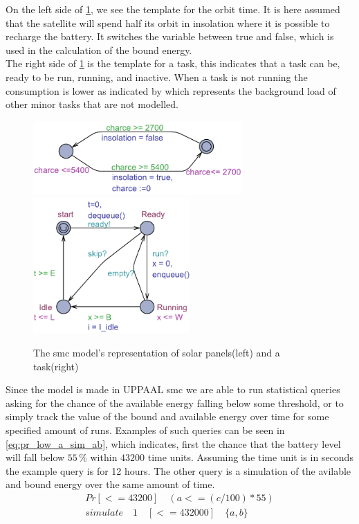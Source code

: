 On the left side of \cref{fig:solar_task}, we see the template for the orbit time. It is here assumed that the satellite will spend half its orbit in insolation where it is possible to recharge the battery. It switches the variable  between true and false, which is used in the calculation of the bound energy.\\
The right side of \cref{fig:solar_task} is the template for a task, this indicates that a task can be, ready to be run, running, and inactive. When a task is not running the consumption is lower as indicated by  which represents the background load of other minor tasks that are not modelled.

\begin{figure}[H]%
	\centering
	\subfloat
	{{\includegraphics[width=8cm]{graphics/smc_solar.pdf} }}%
	\qquad
	\subfloat
	{{\includegraphics[width=6cm]{graphics/smc_task.pdf} }}%
	\caption{The \gls{smc} model's representation of solar panels(left) and a task(right)}%
	\label{fig:solar_task}%
\end{figure}
Since the model is made in UPPAAL \gls{smc} we are able to run statistical queries asking for the chance of the available energy falling below some threshold, or to simply track the value of the bound and available energy over time for some specified amount of runs. Examples of such queries can be seen in \cref{eq:pr_low_a_sim_ab}, which indicates, first the chance that the battery level will fall below $55\, \%$ within $43200$ time units. Assuming the time unit is in seconds the example query is for 12 hours. The other query is a simulation of the avilable and bound energy over the same amount of time.\\
\begin{align}
Pr[<= 43200] \quad(a <= (c/100)*55)		\nonumber \\
simulate \quad 1 \quad [<=432000] \quad \{a,b\} 
\label{eq:pr_low_a_sim_ab}
\end{align}

